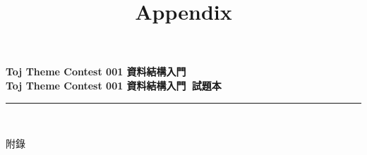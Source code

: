 \documentclass[a4paper]{article}
\title{Appendix}
\begin{document}
\begin{center}
\textbf{\huge Toj Theme Contest 001 資料結構入門}\\
\vspace{5mm}
\textbf{\huge Toj Theme Contest 001 資料結構入門\ 試題本}\\
\vspace{10mm}
\rule{17cm}{2pt}\\
\vspace{5mm}

\huge 附錄\\
\end{center}

\fontsize{14pt}{20pt}\selectfont

\noindent
\end{document}
